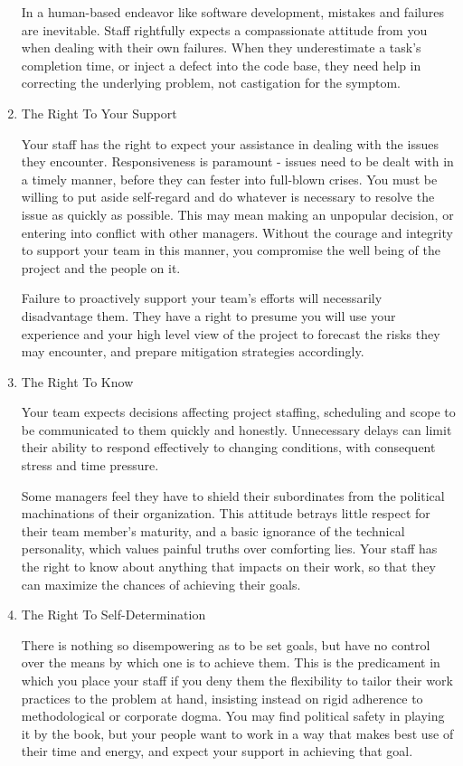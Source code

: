 \documentclass{article}
\begin{document}
\begin{enumerate}
In a human-based endeavor like software development, mistakes and
failures are inevitable. Staff rightfully expects a compassionate
attitude from you when dealing with their own failures. When they
underestimate a task's completion time, or inject a defect into the code
base, they need help in correcting the underlying problem, not
castigation for the symptom.

\item The Right To Your Support
\label{sec:orgheadline139}

Your staff has the right to expect your assistance in dealing with the
issues they encounter. Responsiveness is paramount - issues need to be
dealt with in a timely manner, before they can fester into full-blown
crises. You must be willing to put aside self-regard and do whatever is
necessary to resolve the issue as quickly as possible. This may mean
making an unpopular decision, or entering into conflict with other
managers. Without the courage and integrity to support your team in this
manner, you compromise the well being of the project and the people on
it.

Failure to proactively support your team's efforts will necessarily
disadvantage them. They have a right to presume you will use your
experience and your high level view of the project to forecast the risks
they may encounter, and prepare mitigation strategies accordingly.

\item The Right To Know
\label{sec:orgheadline140}

Your team expects decisions affecting project staffing, scheduling and
scope to be communicated to them quickly and honestly. Unnecessary
delays can limit their ability to respond effectively to changing
conditions, with consequent stress and time pressure.

Some managers feel they have to shield their subordinates from the
political machinations of their organization. This attitude betrays
little respect for their team member's maturity, and a basic ignorance
of the technical personality, which values painful truths over
comforting lies. Your staff has the right to know about anything that
impacts on their work, so that they can maximize the chances of
achieving their goals.

\item The Right To Self-Determination
\label{sec:orgheadline141}

There is nothing so disempowering as to be set goals, but have no
control over the means by which one is to achieve them. This is the
predicament in which you place your staff if you deny them the
flexibility to tailor their work practices to the problem at hand,
insisting instead on rigid adherence to methodological or corporate
dogma. You may find political safety in playing it by the book, but your
people want to work in a way that makes best use of their time and
energy, and expect your support in achieving that goal.


\end{enumerate}
\end{document}

